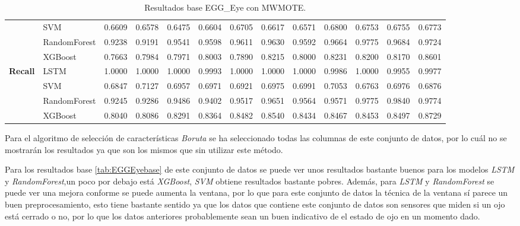 \begin{table}[h]
\begin{adjustbox}{max width=15cm}
\begin{tabular}{|c|l|r|r|r|r|r|r|r|r|r|r|r|}
			& SVM &  0.6609 &  0.6578 &  0.6475 &  0.6604 &  0.6705 &  0.6617 &  0.6571 &  0.6800 &  0.6753 &  0.6755 &  0.6773 \\
			& RandomForest &  0.9238 &  0.9191 &  0.9541 &  0.9598 &  0.9611 &  0.9630 &  0.9592 &  0.9664 &  0.9775 &  0.9684 &  0.9724 \\
			& XGBoost &  0.7663 &  0.7984 &  0.7971 &  0.8003 &  0.7890 &  0.8215 &  0.8000 &  0.8231 &  0.8200 &  0.8170 &  0.8601 \\
			\hline
			\textbf{Recall} & LSTM &  1.0000 &  1.0000 &  1.0000 &  0.9993 &  1.0000 &  1.0000 &  1.0000 &  0.9986 &  1.0000 &  0.9955 &  0.9977 \\
			& SVM &  0.6847 &  0.7127 &  0.6957 &  0.6971 &  0.6921 &  0.6975 &  0.6991 &  0.7053 &  0.6763 &  0.6976 &  0.6876 \\
			& RandomForest &  0.9245 &  0.9286 &  0.9486 &  0.9402 &  0.9517 &  0.9651 &  0.9564 &  0.9571 &  0.9775 &  0.9840 &  0.9774 \\
			& XGBoost &  0.8040 &  0.8086 &  0.8291 &  0.8364 &  0.8482 &  0.8540 &  0.8434 &  0.8467 &  0.8453 &  0.8497 &  0.8729 \\
			\hline
		\end{tabular}
	\end{adjustbox}
\caption{Resultados base EGG\_Eye con MWMOTE.}
\label{tab:EGGEyeMWMOTE}
\end{table}

Para el algoritmo de selección de características \textit{Boruta} se ha  seleccionado todas las columnas de este conjunto de datos, por lo cuál no se mostrarán los resultados ya que son los mismos que sin utilizar este método.\newline

Para los resultados base \ref{tab:EGGEyebase} de este conjunto de datos se puede ver unos resultados bastante buenos para los modelos \textit{LSTM} y \textit{RandomForest},un poco por debajo está \textit{XGBoost}, \textit{SVM} obtiene resultados bastante pobres. Además, para \textit{LSTM} y \textit{RandomForest} se puede ver una mejora conforme se puede aumenta la ventana, por lo que para este conjunto de datos la técnica de la ventana sí parece un buen preprocesamiento, esto tiene bastante sentido ya que los datos que contiene este conjunto de datos son sensores que miden si un ojo está cerrado o no, por lo que los datos anteriores probablemente sean un buen indicativo de el estado de ojo en un momento dado.\newline

